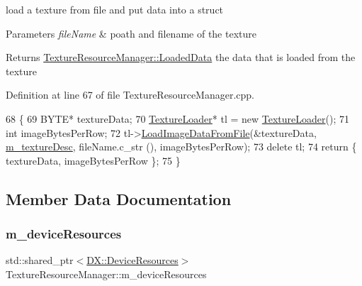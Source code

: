 load a texture from file and put data into a struct 


\begin{DoxyParams}{Parameters}
{\em file\+Name} & poath and filename of the texture \\
\hline
\end{DoxyParams}
\begin{DoxyReturn}{Returns}
\mbox{\hyperlink{struct_texture_resource_manager_1_1_loaded_data}{Texture\+Resource\+Manager\+::\+Loaded\+Data}} the data that is loaded from the texture 
\end{DoxyReturn}


Definition at line 67 of file Texture\+Resource\+Manager.\+cpp.


\begin{DoxyCode}
68 \{
69     BYTE* textureData;
70     \mbox{\hyperlink{class_texture_loader}{TextureLoader}}* tl = \textcolor{keyword}{new} \mbox{\hyperlink{class_texture_loader}{TextureLoader}}();
71     \textcolor{keywordtype}{int} imageBytesPerRow;
72     tl->\mbox{\hyperlink{class_texture_loader_a089f3c76583c3401fcadd85d26d65b31}{LoadImageDataFromFile}}(&textureData, \mbox{\hyperlink{class_texture_resource_manager_a9137a54de5e1a26cf0bb3d37b6b1af93}{m\_textureDesc}}, fileName.c\_str
      (), imageBytesPerRow);
73     \textcolor{keyword}{delete} tl;
74     \textcolor{keywordflow}{return} \{ textureData, imageBytesPerRow \};
75 \}
\end{DoxyCode}


\subsection{Member Data Documentation}
\mbox{\label{class_texture_resource_manager_a0f99144b70c779807f6f674b1ed5b9b7}} 
\subsubsection{\texorpdfstring{m\+\_\+device\+Resources}{m\_deviceResources}}
{\footnotesize\ttfamily std\+::shared\+\_\+ptr$<$\mbox{\hyperlink{class_d_x_1_1_device_resources}{D\+X\+::\+Device\+Resources}}$>$ Texture\+Resource\+Manager\+::m\+\_\+device\+Resources\hspace{0.3cm}{\ttfamily [private]}}



